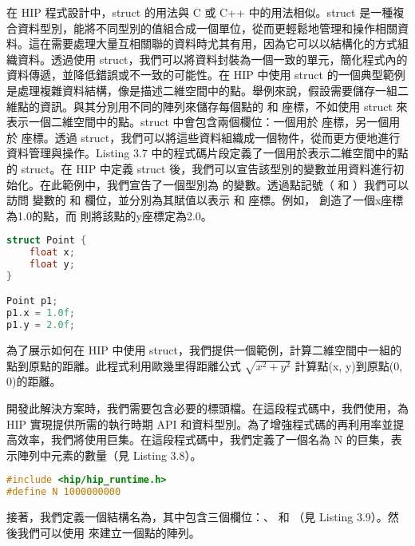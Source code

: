 在 HIP 程式設計中，struct 的用法與 C \cite{kernighan1988c}或 C++ \cite{stroustrup2013cpp}中的用法相似。struct 是一種複合資料型別，能將不同型別的值組合成一個單位，從而更輕鬆地管理和操作相關資料。這在需要處理大量互相關聯的資料時尤其有用，因為它可以以結構化的方式組織資料。透過使用 struct，我們可以將資料封裝為一個一致的單元，簡化程式內的資料傳遞，並降低錯誤或不一致的可能性。在 HIP 中使用 struct 的一個典型範例是處理複雜資料結構，像是描述二維空間中的點。舉例來說，假設需要儲存一組二維點的資訊。與其分別用不同的陣列來儲存每個點的  和  座標，不如使用 struct 來表示一個二維空間中的點。struct 中會包含兩個欄位：一個用於  座標，另一個用於  座標。透過 struct，我們可以將這些資料組織成一個物件，從而更方便地進行資料管理與操作。Listing 3.7 中的程式碼片段定義了一個用於表示二維空間中的點的 struct。在 HIP 中定義 struct 後，我們可以宣告該型別的變數並用資料進行初始化。在此範例中，我們宣告了一個型別為 的變數。透過點記號（ 和 ）我們可以訪問  變數的  和  欄位，並分別為其賦值以表示  和  座標。例如， 創造了一個x座標為1.0的點，而 則將該點的y座標定為2.0。

\begin{lstlisting}[language=C, caption={在HIP kernel中使用結構}, label={7th:example}]
struct Point {
    float x;
    float y;
}

Point p1;
p1.x = 1.0f;
p1.y = 2.0f;
\end{lstlisting}

為了展示如何在 HIP 中使用 struct，我們提供一個範例，計算二維空間中一組的點到原點的距離。此程式利用歐幾里得距離公式 $\sqrt{x^2 + y^2}$ 計算點(x, y)到原點(0, 0)的距離。

開發此解決方案時，我們需要包含必要的標頭檔。在這段程式碼中，我們使用，為 HIP 實現提供所需的執行時期 API 和資料型別。為了增強程式碼的再利用率並提高效率，我們將使用巨集。在這段程式碼中，我們定義了一個名為 N 的巨集，表示陣列中元素的數量（見 Listing 3.8）。

\begin{lstlisting}[language=C, caption={標頭檔與巨集}, label={8th:example}]
#include <hip/hip_runtime.h>
#define N 1000000000
\end{lstlisting}

接著，我們定義一個結構名為，其中包含三個欄位：、 和 （見 Listing 3.9）。然後我們可以使用  來建立一個點的陣列。

